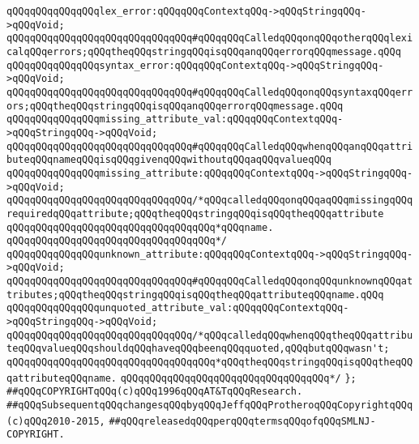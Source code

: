 \verb|qQQqqQQqqQQqqQQqlex_error:qQQqqQQqContextqQQq->qQQqStringqQQq->qQQqVoid;|\newline
\verb|qQQqqQQqqQQqqQQqqQQqqQQqqQQqqQQq#qQQqqQQqCalledqQQqonqQQqotherqQQqlexicalqQQqerrors;qQQqtheqQQqstringqQQqisqQQqanqQQqerrorqQQqmessage.qQQq|\newline
\verb|qQQqqQQqqQQqqQQqsyntax_error:qQQqqQQqContextqQQq->qQQqStringqQQq->qQQqVoid;|\newline
\verb|qQQqqQQqqQQqqQQqqQQqqQQqqQQqqQQq#qQQqqQQqCalledqQQqonqQQqsyntaxqQQqerrors;qQQqtheqQQqstringqQQqisqQQqanqQQqerrorqQQqmessage.qQQq|\newline
\verb|qQQqqQQqqQQqqQQqmissing_attribute_val:qQQqqQQqContextqQQq->qQQqStringqQQq->qQQqVoid;|\newline
\verb|qQQqqQQqqQQqqQQqqQQqqQQqqQQqqQQq#qQQqqQQqCalledqQQqwhenqQQqanqQQqattributeqQQqnameqQQqisqQQqgivenqQQqwithoutqQQqaqQQqvalueqQQq|\newline
\verb|qQQqqQQqqQQqqQQqmissing_attribute:qQQqqQQqContextqQQq->qQQqStringqQQq->qQQqVoid;|\newline
\verb|qQQqqQQqqQQqqQQqqQQqqQQqqQQqqQQq/*qQQqcalledqQQqonqQQqaqQQqmissingqQQqrequiredqQQqattribute;qQQqtheqQQqstringqQQqisqQQqtheqQQqattribute|\newline
\verb|qQQqqQQqqQQqqQQqqQQqqQQqqQQqqQQqqQQq*qQQqname.|\newline
\verb|qQQqqQQqqQQqqQQqqQQqqQQqqQQqqQQqqQQq*/|\newline
\verb|qQQqqQQqqQQqqQQqunknown_attribute:qQQqqQQqContextqQQq->qQQqStringqQQq->qQQqVoid;|\newline
\verb|qQQqqQQqqQQqqQQqqQQqqQQqqQQqqQQq#qQQqqQQqCalledqQQqonqQQqunknownqQQqattributes;qQQqtheqQQqstringqQQqisqQQqtheqQQqattributeqQQqname.qQQq|\newline
\verb|qQQqqQQqqQQqqQQqunquoted_attribute_val:qQQqqQQqContextqQQq->qQQqStringqQQq->qQQqVoid;|\newline
\verb|qQQqqQQqqQQqqQQqqQQqqQQqqQQqqQQq/*qQQqcalledqQQqwhenqQQqtheqQQqattributeqQQqvalueqQQqshouldqQQqhaveqQQqbeenqQQqquoted,qQQqbutqQQqwasn't;|\newline
\verb|qQQqqQQqqQQqqQQqqQQqqQQqqQQqqQQqqQQq*qQQqtheqQQqstringqQQqisqQQqtheqQQqattributeqQQqname.|\newline
\verb|qQQqqQQqqQQqqQQqqQQqqQQqqQQqqQQqqQQq*/|\newline
\newline
\verb|};|\newline
\newline
\newline
\verb|##qQQqCOPYRIGHTqQQq(c)qQQq1996qQQqAT&TqQQqResearch.|\newline
\verb|##qQQqSubsequentqQQqchangesqQQqbyqQQqJeffqQQqProtheroqQQqCopyrightqQQq(c)qQQq2010-2015,|\newline
\verb|##qQQqreleasedqQQqperqQQqtermsqQQqofqQQqSMLNJ-COPYRIGHT.|\newline


